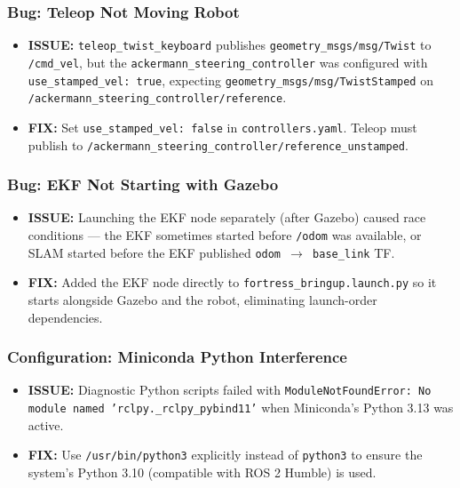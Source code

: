 \documentclass[11pt]{article}
\newcommand{\issue}[1]{\textcolor{issuered}{\textbf{ISSUE:} #1}}
\newcommand{\fix}[1]{\textcolor{fixgreen}{\textbf{FIX:} #1}}
\begin{document}
\subsubsection*{Bug: Teleop Not Moving Robot}
\begin{itemize}
  \item \issue{\texttt{teleop\_twist\_keyboard} publishes
    \texttt{geometry\_msgs/msg/Twist} to \texttt{/cmd\_vel}, but the
    \texttt{ackermann\_steering\_controller} was configured with
    \texttt{use\_stamped\_vel: true}, expecting
    \texttt{geometry\_msgs/msg/TwistStamped} on
    \texttt{/ackermann\_steering\_controller/reference}.}
  \item \fix{Set \texttt{use\_stamped\_vel: false} in \texttt{controllers.yaml}.
    Teleop must publish to
    \texttt{/ackermann\_steering\_controller/reference\_unstamped}.}
\end{itemize}

\subsubsection*{Bug: EKF Not Starting with Gazebo}
\begin{itemize}
  \item \issue{Launching the EKF node separately (after Gazebo) caused race
    conditions --- the EKF sometimes started before \texttt{/odom} was available,
    or SLAM started before the EKF published \texttt{odom $\to$ base\_link} TF.}
  \item \fix{Added the EKF node directly to
    \texttt{fortress\_bringup.launch.py} so it starts alongside Gazebo and
    the robot, eliminating launch-order dependencies.}
\end{itemize}

\subsubsection*{Configuration: Miniconda Python Interference}
\begin{itemize}
  \item \issue{Diagnostic Python scripts failed with
    \texttt{ModuleNotFoundError: No module named 'rclpy.\_rclpy\_pybind11'}
    when Miniconda's Python 3.13 was active.}
  \item \fix{Use \texttt{/usr/bin/python3} explicitly instead of \texttt{python3}
    to ensure the system's Python 3.10 (compatible with ROS 2 Humble) is used.}
\end{itemize}
\end{document}
